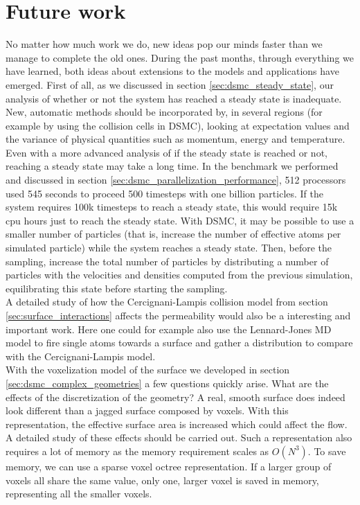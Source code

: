 \section{Future work}
No matter how much work we do, new ideas pop our minds faster than we manage to complete the old ones. During the past months, through everything we have learned, both ideas about extensions to the models and applications have emerged. First of all, as we discussed in section \ref{sec:dsmc_steady_state}, our analysis of whether or not the system has reached a steady state is inadequate. New, automatic methods should be incorporated by, in several regions (for example by using the collision cells in DSMC), looking at expectation values and the variance of physical quantities such as momentum, energy and temperature. Even with a more advanced analysis of if the steady state is reached or not, reaching a steady state may take a long time. In the benchmark we performed and discussed in section \ref{sec:dsmc_parallelization_performance}, 512 processors used 545 seconds to proceed 500 timesteps with one billion particles. If the system requires 100k timesteps to reach a steady state, this would require 15k cpu hours just to reach the steady state. With DSMC, it may be possible to use a smaller number of particles (that is, increase the number of effective atoms per simulated particle) while the system reaches a steady state. Then, before the sampling, increase the total number of particles by distributing a number of particles with the velocities and densities computed from the previous simulation, equilibrating this state before starting the sampling. \\
A detailed study of how the Cercignani-Lampis collision model from section \ref{sec:surface_interactions} affects the permeability would also be a interesting and important work. Here one could for example also use the Lennard-Jones MD model to fire single atoms towards a surface and gather a distribution to compare with the Cercignani-Lampis model.\\
With the voxelization model of the surface we developed in section \ref{sec:dsmc_complex_geometries} a few questions quickly arise. What are the effects of the discretization of the geometry? A real, smooth surface does indeed look different than a jagged surface composed by voxels. With this representation, the effective surface area is increased which could affect the flow. A detailed study of these effects should be carried out. Such a representation also requires a lot of memory as the memory requirement scales as $O(N^3)$. To save memory, we can use a sparse voxel octree representation. If a larger group of voxels all share the same value, only one, larger voxel is saved in memory, representing all the smaller voxels.\\
